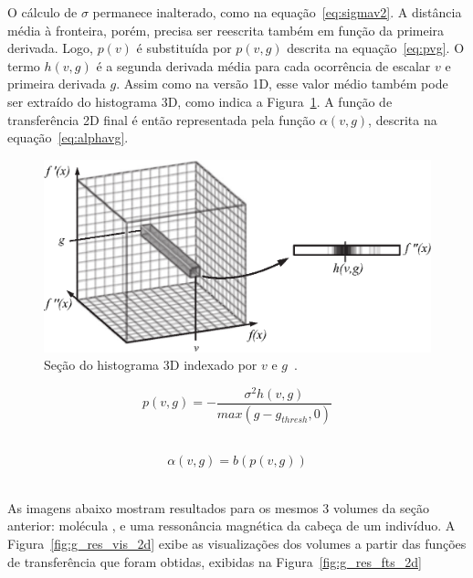	O cálculo de $\sigma$ permanece inalterado, como na equação~\eqref{eq:sigmav2}. A distância média à fronteira, porém, precisa ser reescrita também em função da primeira derivada. Logo, $p(v)$ é substituída por $p(v,g)$ descrita na equação~\eqref{eq:pvg}. O termo $h(v,g)$ é a segunda derivada média para cada ocorrência de escalar $v$ e primeira derivada $g$. Assim como na versão 1D, esse valor médio também pode ser extraído do histograma 3D, como indica a Figura~\ref{fig:g_hvg}. A função de transferência 2D final é então representada pela função $ \alpha(v, g) $, descrita na equação~\eqref{eq:alphavg}.
    
\begin{figure}[h]
	\centering
	\includegraphics[width=1\textwidth]{images/g_hvg}
	\caption{Seção do histograma 3D indexado por $ v $ e $ g $~\cite{gordonms}.}
	\label{fig:g_hvg}
\end{figure}
    
\begin{equation} \label{eq:pvg}
	p(v,g) = -\frac{\sigma^{2}h(v,g)}{max(g - g_{thresh}, 0)}
\end{equation} \

\begin{equation} \label{eq:alphavg}
	\alpha(v, g) = b(p(v, g))
\end{equation} \

	As imagens abaixo mostram resultados para os mesmos 3 volumes da seção anterior: molécula ,  e uma ressonância magnética da cabeça de um indivíduo. A Figura~\ref{fig:g_res_vis_2d} exibe as visualizações dos volumes a partir das funções de transferência que foram obtidas, exibidas na Figura~\ref{fig:g_res_fts_2d}
	
